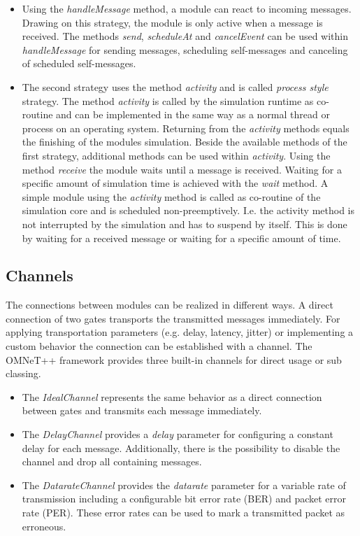 \begin{itemize}
    \item Using the \emph{handleMessage} method, a module can react to incoming messages.
    Drawing on this strategy, the module is only active when a message is received.
    The methods \emph{send}, \emph{scheduleAt} and \emph{cancelEvent} can be used within \emph{handleMessage} for sending messages, scheduling self-messages and canceling of scheduled self-messages. \cite[section 4.4.1]{omnet_manual}
    
    \item The second strategy uses the method \emph{activity} and is called \emph{process style} strategy.
    The method \emph{activity} is called by the simulation runtime as co-routine and can be implemented in the same way as a normal thread or process on an operating system.
    Returning from the \emph{activity} methods equals the finishing of the modules simulation.
    Beside the available methods of the first strategy, additional methods can be used within \emph{activity}.
    Using the method \emph{receive} the module waits until a message is received.
    Waiting for a specific amount of simulation time is achieved with the \emph{wait} method.
    A simple module using the \emph{activity} method is called as co-routine of the simulation core and is scheduled non-preemptively.
    I.e. the activity method is not interrupted by the simulation and has to suspend by itself.
    This is done by waiting for a received message or waiting for a specific amount of time. \cite[section 4.4.2]{omnet_manual}
\end{itemize}

\subsection{Channels}
\label{sec:omnet_components_channels}
The connections between modules can be realized in different ways.
A direct connection of two gates transports the transmitted messages immediately.
For applying transportation parameters (e.g. delay, latency, jitter) or implementing a custom behavior the connection can be established with a channel.
The OMNeT++ framework provides three built-in channels for direct usage or sub classing.

\begin{itemize}
    \item The \emph{IdealChannel} represents the same behavior as a direct connection between gates and transmits each message immediately.
    \item The \emph{DelayChannel} provides a \emph{delay} parameter for configuring a constant delay for each message.
    Additionally, there is the possibility to disable the channel and drop all containing messages.
    \item The \emph{DatarateChannel} provides the \emph{datarate} parameter for a variable rate of transmission including a configurable bit error rate (BER) and packet error rate (PER).
    These error rates can be used to mark a transmitted packet as erroneous.
\end{itemize}

